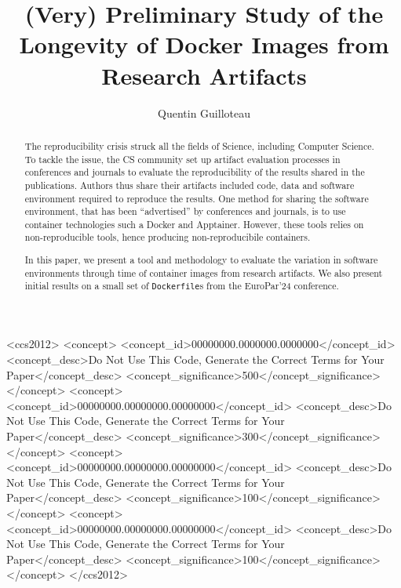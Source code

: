 \documentclass[sigconf,natbib=false]{acmart}
\newcommand{\df}{\texttt{Dockerfile}}
\begin{document}
\title{%
  (Very) Preliminary Study of the Longevity of Docker Images from Research Artifacts
}

\author{Quentin Guilloteau}


\begin{abstract}
  The reproducibility crisis struck all the fields of Science, including Computer Science.
  To tackle the issue, the CS community set up artifact evaluation processes in conferences and journals to evaluate the reproducibility of the results shared in the publications.
  Authors thus share their artifacts included code, data and software environment required to reproduce the results.
  One method for sharing the software environment, that has been ``advertised'' by conferences and journals, is to use container technologies such a Docker and Apptainer.
  However, these tools relies on non-reproducible tools, hence producing non-reproducibile containers.

  In this paper, we present a tool and methodology to evaluate the variation in software environments through time of container images from research artifacts.
  We also present initial results on a small set of \df s from the EuroPar'24 conference.
\end{abstract}

\begin{CCSXML}
<ccs2012>
 <concept>
  <concept_id>00000000.0000000.0000000</concept_id>
  <concept_desc>Do Not Use This Code, Generate the Correct Terms for Your Paper</concept_desc>
  <concept_significance>500</concept_significance>
 </concept>
 <concept>
  <concept_id>00000000.00000000.00000000</concept_id>
  <concept_desc>Do Not Use This Code, Generate the Correct Terms for Your Paper</concept_desc>
  <concept_significance>300</concept_significance>
 </concept>
 <concept>
  <concept_id>00000000.00000000.00000000</concept_id>
  <concept_desc>Do Not Use This Code, Generate the Correct Terms for Your Paper</concept_desc>
  <concept_significance>100</concept_significance>
 </concept>
 <concept>
  <concept_id>00000000.00000000.00000000</concept_id>
  <concept_desc>Do Not Use This Code, Generate the Correct Terms for Your Paper</concept_desc>
  <concept_significance>100</concept_significance>
 </concept>
</ccs2012>
\end{CCSXML}
\end{document}
